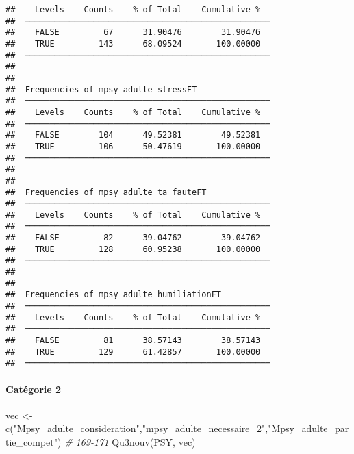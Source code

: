 \documentclass[
]{article}
\newenvironment{Shaded}{\begin{snugshade}}{\end{snugshade}}
\newcommand{\CommentTok}[1]{\textcolor[rgb]{0.56,0.35,0.01}{\textit{#1}}}
\newcommand{\FunctionTok}[1]{\textcolor[rgb]{0.00,0.00,0.00}{#1}}
\newcommand{\NormalTok}[1]{#1}
\newcommand{\OtherTok}[1]{\textcolor[rgb]{0.56,0.35,0.01}{#1}}
\newcommand{\StringTok}[1]{\textcolor[rgb]{0.31,0.60,0.02}{#1}}
\begin{document}
\begin{verbatim}
##    Levels    Counts    % of Total    Cumulative %   
##  ────────────────────────────────────────────────── 
##    FALSE         67      31.90476        31.90476   
##    TRUE         143      68.09524       100.00000   
##  ────────────────────────────────────────────────── 
## 
## 
##  Frequencies of mpsy_adulte_stressFT                
##  ────────────────────────────────────────────────── 
##    Levels    Counts    % of Total    Cumulative %   
##  ────────────────────────────────────────────────── 
##    FALSE        104      49.52381        49.52381   
##    TRUE         106      50.47619       100.00000   
##  ────────────────────────────────────────────────── 
## 
## 
##  Frequencies of mpsy_adulte_ta_fauteFT              
##  ────────────────────────────────────────────────── 
##    Levels    Counts    % of Total    Cumulative %   
##  ────────────────────────────────────────────────── 
##    FALSE         82      39.04762        39.04762   
##    TRUE         128      60.95238       100.00000   
##  ────────────────────────────────────────────────── 
## 
## 
##  Frequencies of mpsy_adulte_humiliationFT           
##  ────────────────────────────────────────────────── 
##    Levels    Counts    % of Total    Cumulative %   
##  ────────────────────────────────────────────────── 
##    FALSE         81      38.57143        38.57143   
##    TRUE         129      61.42857       100.00000   
##  ──────────────────────────────────────────────────
\end{verbatim}

\hypertarget{catuxe9gorie-2-1}{%
\paragraph{Catégorie 2}\label{catuxe9gorie-2-1}}

\begin{Shaded}
\begin{Highlighting}[]
\NormalTok{vec }\OtherTok{\textless{}{-}} \FunctionTok{c}\NormalTok{(}\StringTok{"Mpsy\_adulte\_consideration"}\NormalTok{,}\StringTok{"mpsy\_adulte\_necessaire\_2"}\NormalTok{,}\StringTok{"Mpsy\_adulte\_partie\_compet"}\NormalTok{)  }\CommentTok{\# 169{-}171}
\FunctionTok{Qu3nouv}\NormalTok{(PSY, vec)}
\end{Highlighting}
\end{Shaded}
\end{document}
